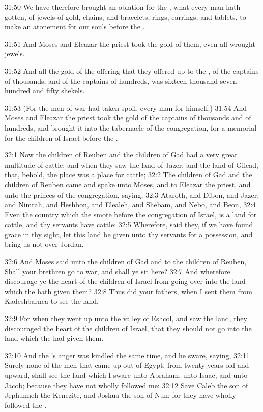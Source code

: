 31:50 We have therefore brought an oblation for the \LORD, what every
man hath gotten, of jewels of gold, chains, and bracelets, rings,
earrings, and tablets, to make an atonement for our souls before the
\LORD.

31:51 And Moses and Eleazar the priest took the gold of them, even all
wrought jewels.

31:52 And all the gold of the offering that they offered up to the
\LORD, of the captains of thousands, and of the captains of hundreds,
was sixteen thousand seven hundred and fifty shekels.

31:53 (For the men of war had taken spoil, every man for himself.)
31:54 And Moses and Eleazar the priest took the gold of the captains
of thousands and of hundreds, and brought it into the tabernacle of
the congregation, for a memorial for the children of Israel before the
\LORD.

32:1 Now the children of Reuben and the children of Gad had a very
great multitude of cattle: and when they saw the land of Jazer, and
the land of Gilead, that, behold, the place was a place for cattle;
32:2 The children of Gad and the children of Reuben came and spake
unto Moses, and to Eleazar the priest, and unto the princes of the
congregation, saying, 32:3 Ataroth, and Dibon, and Jazer, and Nimrah,
and Heshbon, and Elealeh, and Shebam, and Nebo, and Beon, 32:4 Even
the country which the \LORD smote before the congregation of Israel, is
a land for cattle, and thy servants have cattle: 32:5 Wherefore, said
they, if we have found grace in thy sight, let this land be given unto
thy servants for a possession, and bring us not over Jordan.

32:6 And Moses said unto the children of Gad and to the children of
Reuben, Shall your brethren go to war, and shall ye sit here?  32:7
And wherefore discourage ye the heart of the children of Israel from
going over into the land which the \LORD hath given them?  32:8 Thus
did your fathers, when I sent them from Kadeshbarnea to see the land.

32:9 For when they went up unto the valley of Eshcol, and saw the
land, they discouraged the heart of the children of Israel, that they
should not go into the land which the \LORD had given them.

32:10 And the \LORD's anger was kindled the same time, and he sware,
saying, 32:11 Surely none of the men that came up out of Egypt, from
twenty years old and upward, shall see the land which I sware unto
Abraham, unto Isaac, and unto Jacob; because they have not wholly
followed me: 32:12 Save Caleb the son of Jephunneh the Kenezite, and
Joshua the son of Nun: for they have wholly followed the \LORD.

